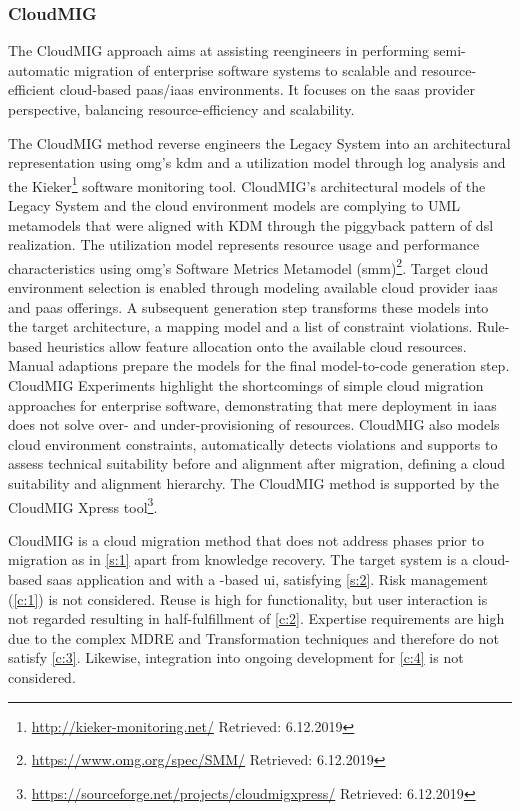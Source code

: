 \hypertarget{cloudmig}{%
\subsubsection*{CloudMIG}\label{cloudmig}}

The CloudMIG approach \autocite{Frey2010CloudMIG,Frey2011CloudMIG,Frey2011CloudMIGContraints,Frey2012CloudMIGConformance} aims at assisting reengineers in performing semi-automatic migration of enterprise software systems to scalable and resource-efficient cloud-based \gls{paas}/\gls{iaas} environments.
It focuses on the \gls{saas} provider perspective, balancing resource-efficiency and scalability.

The CloudMIG method reverse engineers the \gls{Legacy System} into an architectural representation using \gls{omg}'s \gls{kdm} and a utilization model through log analysis and the Kieker\footnote{\url{http://kieker-monitoring.net/} Retrieved: 6.12.2019} software monitoring tool.
CloudMIG's architectural models of the \gls{Legacy System} and the cloud environment models are complying to UML metamodels that were aligned with KDM through the piggyback pattern of \gls{dsl} realization.
The utilization model represents resource usage and performance characteristics using \gls{omg}'s Software Metrics Metamodel (\gls{smm})\footnote{\url{https://www.omg.org/spec/SMM/} Retrieved: 6.12.2019}.
Target cloud environment selection is enabled through modeling available cloud provider \gls{iaas} and \gls{paas} offerings.
A subsequent generation step transforms these models into the target architecture, a mapping model and a list of constraint violations.
Rule-based heuristics allow feature allocation onto the available cloud resources.
Manual adaptions prepare the models for the final model-to-code generation step.
CloudMIG Experiments highlight the shortcomings of simple cloud migration approaches for enterprise software, demonstrating that mere deployment in \gls{iaas} does not solve over- and under-provisioning of resources.
CloudMIG also models cloud environment constraints, automatically detects violations and supports to assess technical suitability before and alignment after migration, defining a cloud suitability and alignment hierarchy.
The CloudMIG method is supported by the CloudMIG Xpress tool\footnote{\url{https://sourceforge.net/projects/cloudmigxpress/} Retrieved: 6.12.2019}.

CloudMIG is a cloud migration method that does not address phases prior to migration as in \cref{s:1} apart from knowledge recovery.
The \gls{target system} is a cloud-based \gls{saas} application and with a -based \gls{ui}, satisfying \cref{s:2}.
Risk management (\cref{c:1}) is not considered.
Reuse is high for  functionality, but user interaction is not regarded resulting in half-fulfillment of \cref{c:2}.
Expertise requirements are high due to the complex MDRE and \gls{Transformation} techniques and therefore do not satisfy \cref{c:3}.
Likewise, integration into ongoing development for \cref{c:4} is not considered.

